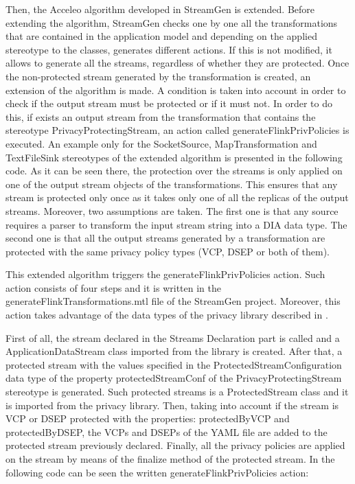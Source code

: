 Then, the Acceleo algorithm developed in StreamGen is extended. Before extending the algorithm, StreamGen checks one by one all the transformations that are contained in the application model and depending on the applied stereotype to the classes, generates different actions. If this is not modified, it allows to generate all the streams, regardless of whether they are protected. Once the non-protected stream generated by the transformation is created, an extension of the algorithm is made. A condition is taken into account in order to check if the output stream must be protected or if it must not. In order to do this, if exists an output stream from the transformation that contains the stereotype PrivacyProtectingStream, an action called generateFlinkPrivPolicies is executed. An example only for the SocketSource, MapTransformation and TextFileSink stereotypes of the extended algorithm is presented in the following code. As it can be seen there, the protection over the streams is only applied on one of the output stream objects of the transformations. This ensures that any stream is protected only once as it takes only one of all the replicas of the output streams. Moreover, two assumptions are taken. The first one is that any source requires a parser to transform the input stream string into a DIA data type. The second one is that all the output streams generated by a transformation are protected with the same privacy policy types (VCP, DSEP or both of them).



This extended algorithm triggers the generateFlinkPrivPolicies action. Such action consists of four steps and it is written in the generateFlinkTransformations.mtl file of the StreamGen project. Moreover, this action takes advantage of the data types of the privacy library described in \cite{privacypoliciesarticle}.

First of all, the stream declared in the Streams Declaration part is called and a ApplicationDataStream class imported from the library is created. After that, a protected stream with the values specified in the ProtectedStreamConfiguration data type of the property protectedStreamConf of the PrivacyProtectingStream stereotype is generated. Such protected streams is a ProtectedStream class and it is imported from the privacy library. Then, taking into account if the stream is VCP or DSEP protected with the properties: protectedByVCP and protectedByDSEP, the VCPs and DSEPs of the YAML file are added to the protected stream previously declared. Finally, all the privacy policies are applied on the stream by means of the finalize method of the protected stream. In the following code can be seen the written generateFlinkPrivPolicies action:





















